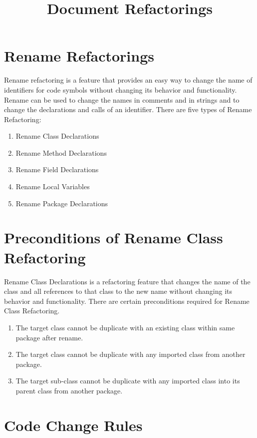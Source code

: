 \documentclass[10pt,conference]{IEEEtran}
\begin{document}
\title{Document Refactorings}

\author{
\and
{}
\and
{}
}

\maketitle

\section{\textbf{Rename Refactorings}}
Rename refactoring is a feature that provides an easy way to change the name of identifiers for code symbols without changing its behavior and functionality. Rename can be used to change the names in comments and in strings and to change the declarations and calls of an identifier.
There are five types of Rename Refactoring: 
\begin{enumerate}
	\item Rename Class Declarations 
	\item Rename Method Declarations  
	\item Rename Field Declarations  
	\item Rename Local Variables  
	\item Rename Package Declarations
\end{enumerate}

\section{\textbf{Preconditions of Rename Class Refactoring}}
Rename Class Declarations is a refactoring feature that changes the name of the class and all references to that class to the new name without changing its behavior and functionality. There are certain preconditions required for Rename Class Refactoring. 
\begin{enumerate}
	\item The target class cannot be duplicate with an existing class within same package after rename.
	\item The target class cannot be duplicate with any imported class from another package.
	\item The target sub-class cannot be duplicate with any imported class into its parent class from another package. 
\end{enumerate}

\label{sec:precon1}
	
\label{sec:precon2}




\section{\textbf{Code Change Rules}}




\end{document}
